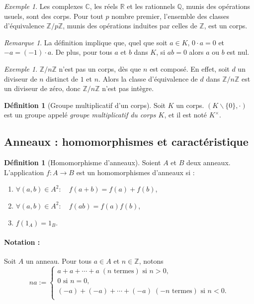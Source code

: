 \documentclass[a4paper, titlepage]{article}
\theoremstyle{definition}
\newtheorem{defi}[theo]{Définition}
\theoremstyle{remark}
\newtheorem{rema}[theo]{Remarque}
\newtheorem{exem}[theo]{Exemple}
\def\Z{\mathbb Z}
\def\Q{\mathbb Q}
\def\R{\mathbb R}
\def\C{\mathbb C}
\begin{document}
\begin{exem}
Les complexes $\C$, les réels $\R$ et les rationnels $\Q$, munis des opérations usuels, sont des corps. Pour tout $p$ nombre premier, l'ensemble des classes d'équivalence $\Z/p\Z$, munis des opérations induites par celles de $\Z$, est un corps.
\end{exem}

\begin{rema}
La définition implique que, quel que soit $a \in K$, $0\cdot a = 0$ et $-a = (-1)\cdot a$. De plus, pour tous $a$ et $b$ dans $K$, si $ab = 0$ alors $a$ ou $b$ est nul.
\end{rema}

\begin{exem}
$\Z/n\Z$ n'est pas un corps, dès que $n$ est composé. En effet, soit $d$ un diviseur de $n$ distinct de $1$ et $n$. Alors la classe d'équivalence de $d$ dans $\Z/n\Z$ est un diviseur de zéro, donc $\Z/n\Z$ n'est pas intègre.
\end{exem}

\begin{defi}[Groupe multiplicatif d'un corps]
Soit $K$ un corps. $(K\backslash\{0\},\cdot)$ est un groupe appelé \textit{groupe multiplicatif du corps $K$}, et il est noté $K^\times$.
\end{defi}

\subsection{Anneaux : homomorphismes et caractéristique}

\begin{defi}[Homomorphisme d'anneaux]\label{defMorphismeAnneaux}
Soient $A$ et $B$ deux anneaux. L'application $f: A \rightarrow B$ est un homomorphismes d'anneaux si : \begin{enumerate}
\item $\forall (a,b) \in A^2: \quad f(a+b) = f(a) + f(b)$,
\item $\forall (a,b) \in A^2: \quad f(ab) = f(a)f(b)$,
\item $f(1_A) = 1_B$.
\end{enumerate}
\end{defi}

\paragraph*{Notation :}
Soit $A$ un anneau. Pour tous $a \in A$ et $n \in \Z$, notons
$$na := \left\{\begin{array}{l}
a + a + \cdots + a \; (n \text{ termes}) \text{ si } n > 0,\\
0 \text{ si } n = 0,\\
(-a) + (-a) + \cdots + (-a)\; (-n \text{ termes}) \text{ si } n < 0.\\
\end{array}\right.$$
\end{document}
